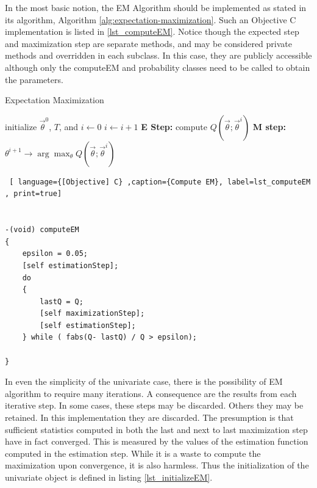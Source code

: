 \documentclass[11pt]{article}
\begin{document}

In the most basic notion, the EM Algorithm should be implemented as stated in its algorithm, Algorithm \ref{alg:expectation-maximization}.  Such an Objective C implementation is listed in \ref{lst_computeEM}.  Notice though the expected step and maximization step are separate methods, and may be considered private methods and overridden in each subclass.  In this case, they are publicly accessible although only the computeEM and probability classes need to be called to obtain the parameters.  


\begin{algorithm}
\caption{Expectation Maximization}
\label{alg:expectation-maximization}
\begin{algorithmic}
	\STATE initialize $\vec{\theta}^0$, $T$, and $i \leftarrow 0$
	\REPEAT
		\STATE $i \leftarrow i + 1$
		\STATE \textbf{E Step:} compute $Q(\vec{\theta} ; \vec{\theta}^i)$ 
		\STATE \textbf{M step:} $\theta ^{i+1} \rightarrow \arg \max _{\theta} Q(\vec{\theta} ; \vec{\theta} ^i)$ 
\end{algorithmic}
\end{algorithm}

\begin{lstlisting} [ language={[Objective] C} ,caption={Compute EM}, label=lst_computeEM , print=true] 


-(void) computeEM
{
	epsilon = 0.05;
	[self estimationStep];
	do 
	{
		lastQ = Q;
		[self maximizationStep];
		[self estimationStep];
	} while ( fabs(Q- lastQ) / Q > epsilon);

}

\end{lstlisting}

In even the simplicity of the univariate case, there is the possibility of EM algorithm to require many iterations.  A consequence are the results from each iterative step.  In some cases, these steps may be discarded.  Others they may be retained.  In this implementation  they are discarded.  The presumption is that sufficient statistics computed in both the last and next to last maximization step have in fact converged.  This is measured by the values of the estimation function computed in the estimation step.  While it is a waste to compute the maximization upon convergence, it is also harmless.  Thus the initialization of the univariate object is defined in listing \ref{lst_initializeEM}.
\end{document}
